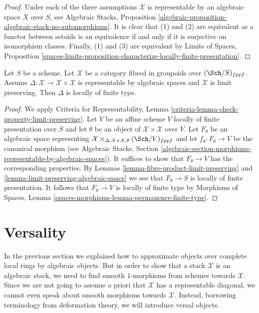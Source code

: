 \begin{proof}
Under each of the three assumptions $\mathcal{X}$ is representable
by an algebraic space $X$ over $S$, see Algebraic Stacks, Proposition
\ref{algebraic-proposition-algebraic-stack-no-automorphisms}.
It is clear that (1) and (2) are equivalent as a functor between
setoids is an equivalence if and only if it is surjective on isomorphism
classes. Finally, (1) and (3) are equivalent by
Limits of Spaces, Proposition
\ref{spaces-limits-proposition-characterize-locally-finite-presentation}.
\end{proof}

\begin{lemma}
\label{lemma-diagonal}
Let $S$ be a scheme. Let $\mathcal{X}$ be a category fibred
in groupoids over $(\Sch/S)_{fppf}$. Assume
$\Delta : \mathcal{X} \to \mathcal{X} \times \mathcal{X}$ is
representable by algebraic spaces and $\mathcal{X}$ is limit preserving.
Then $\Delta$ is locally of finite type.
\end{lemma}

\begin{proof}
We apply Criteria for Representability, Lemma
\ref{criteria-lemma-check-property-limit-preserving}.
Let $V$ be an affine scheme $V$ locally of finite presentation over $S$
and let $\theta$ be an object of $\mathcal{X} \times \mathcal{X}$
over $V$. Let $F_\theta$ be an algebraic space representing
$\mathcal{X} \times_{\Delta, \mathcal{X} \times \mathcal{X}, \theta}
(\Sch/V)_{fppf}$ and let $f_\theta : F_\theta \to V$ be the canonical morphism
(see Algebraic Stacks, Section
\ref{algebraic-section-morphisms-representable-by-algebraic-spaces}).
It suffices to show that
$F_\theta \to V$ has the corresponding properties. By
Lemmas \ref{lemma-fibre-product-limit-preserving} and
\ref{lemma-limit-preserving-algebraic-space}
we see that $F_\theta \to S$ is locally of finite presentation.
It follows that $F_\theta \to V$ is locally of finite type
by Morphisms of Spaces, Lemma
\ref{spaces-morphisms-lemma-permanence-finite-type}.
\end{proof}






\section{Versality}
\label{section-versality}

\noindent
In the previous section we explained how to approximate objects over
complete local rings by algebraic objects. But in order to show that
a stack $\mathcal{X}$ is an algebraic stack, we need to find smooth
$1$-morphisms from schemes towards $\mathcal{X}$. Since we are not going
to assume a priori that $\mathcal{X}$ has a representable diagonal, we
cannot even speak about smooth morphisms towards $\mathcal{X}$. Instead,
borrowing terminology from deformation theory, we will introduce versal
objects.

